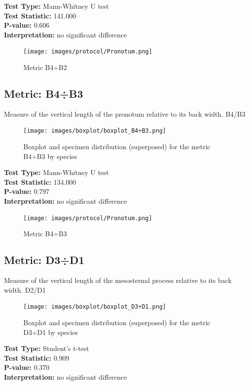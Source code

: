\noindent\textbf{Test Type:} Mann-Whitney U test \\
\noindent\textbf{Test Statistic:} 141.000 \\
\noindent\textbf{P-value:} 0.606 \\
\noindent\textbf{Interpretation:} no significant difference

\begin{figure}[H]
\centering
\texttt{[image: images/protocol/Pronotum.png]}
\caption{ Metric B4÷B2}
\end{figure}

\newpage
\subsection*{Metric: B4÷B3}

Measure of the vertical length of the pronotum relative to its back width. B4/B3

\begin{figure}[H]
\centering
\texttt{[image: images/boxplot/boxplot\_B4÷B3.png]}
\caption{  Boxplot and specimen distribution (superposed) for the metric  B4÷B3 by species}
\end{figure}

\noindent\textbf{Test Type:} Mann-Whitney U test \\
\noindent\textbf{Test Statistic:} 134.000 \\
\noindent\textbf{P-value:} 0.797 \\
\noindent\textbf{Interpretation:} no significant difference

\begin{figure}[H]
\centering
\texttt{[image: images/protocol/Pronotum.png]}
\caption{ Metric B4÷B3}
\end{figure}

\newpage
\subsection*{Metric: D3÷D1}

Measure of the vertical length of the mesosternal process relative to its back width. D2/D1

\begin{figure}[H]
\centering
\texttt{[image: images/boxplot/boxplot\_D3÷D1.png]}
\caption{  Boxplot and specimen distribution (superposed) for the metric  D3÷D1 by species}
\end{figure}

\noindent\textbf{Test Type:} Student's t-test \\
\noindent\textbf{Test Statistic:} 0.909 \\
\noindent\textbf{P-value:} 0.370 \\
\noindent\textbf{Interpretation:} no significant difference

